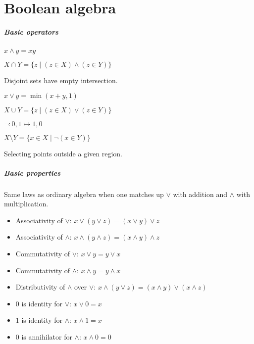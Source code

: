 \section{Boolean algebra}
\subparagraph{Basic operators}
\begin{definition}[Conjonction]
	$x \land y = xy$
\end{definition}
\begin{definition}[Intersection]
	$X \cap Y = \{ z \mid (z \in X) \land (z \in Y) \}$
\end{definition}
\begin{remark}
	Disjoint sets have empty intersection.
\end{remark}
\begin{definition}[Disjunction]
	$x \lor y = \min(x+y,1)$
\end{definition}
\begin{definition}[Union]
	$X \cup Y = \{ z \mid (z \in X) \lor (z \in Y) \}$
\end{definition}
\begin{definition}[Negation]
	$\lnot: 0,1 \mapsto 1,0$
\end{definition}
\begin{definition}
	$X \setminus Y = \{ x \in X \mid \lnot (x \in Y) \}$
\end{definition}
\begin{question}
	Selecting points outside a given region.
\end{question}
\subparagraph{Basic properties}
\begin{property}
	Same laws as ordinary algebra when one matches up $\lor$ with addition and $\land$ with multiplication.
	\begin{itemize}
		\item Associativity of $\lor$: $x \lor (y \lor z) = (x \lor y) \lor z$
		\item Associativity of $\land$: $x \land (y \land z) = (x \land y) \land z$
		\item Commutativity of $\lor$: $x \lor y  = y \lor x$
		\item Commutativity of $\land$: $x \land y  = y \land x$
		\item Distributivity of $\land$ over $\lor$:  $x \land (y \lor z) = (x \land y) \lor (x \land z)$
		\item $0$ is identity for $\lor$: $x \lor 0  = x$
		\item $1$ is identity for $\land$: $x \land 1  = x$
		\item $0$ is annihilator for $\land$: $x \land 0  = 0$
	\end{itemize}
\end{property}
